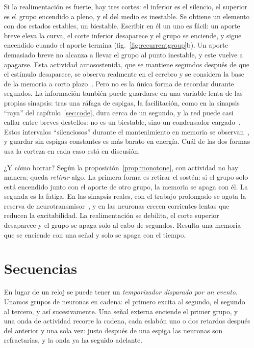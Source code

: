 Si la realimentación es fuerte, hay tres cortes: el inferior es el silencio, el superior es el grupo encendido a pleno, y el del medio es inestable. Se obtiene un elemento con dos estados estables, un biestable. Escribir en él un uno es fácil: un aporte breve eleva la curva, el corte inferior desaparece y el grupo se enciende, y sigue encendido cuando el aporte termina (fig.~\ref{fig:recurrentgroup}b). Un aporte demasiado breve no alcanza a llevar el grupo al punto inestable, y este vuelve a apagarse. Esta actividad autosostenida, que se mantiene segundos después de que el estímulo desaparece, se observa realmente en el cerebro y se considera la base de la memoria a corto plazo~\cite{Wang2001}. Pero no es la única forma de recordar durante segundos. La información también puede guardarse en una variable lenta de las propias sinapsis: tras una ráfaga de espigas, la facilitación, como en la sinapsis “raya” del capítulo~\ref{sec:code}, dura cerca de un segundo, y la red puede casi callar entre breves destellos: no es un biestable, sino un condensador cargado~\cite{Mongillo2008}. Estos intervalos “silenciosos” durante el mantenimiento en memoria se observan~\cite{Stokes2015}, y guardar sin espigas constantes es más barato en energía. Cuál de las dos formas usa la corteza en cada caso está en discusión.

¿Y cómo borrar? Según la proposición~\ref{prop:monotone}, con actividad no hay manera; queda \emph{retirar} algo. La primera forma es retirar el sostén: si el grupo solo está encendido junto con el aporte de otro grupo, la memoria se apaga con él. La segunda es la fatiga. En las sinapsis reales, con el trabajo prolongado se agota la reserva de neurotransmisor~\cite{Tsodyks1997}, y en las neuronas crecen corrientes lentas que reducen la excitabilidad. La realimentación se debilita, el corte superior desaparece y el grupo se apaga solo al cabo de segundos. Resulta una memoria que se enciende con una señal y solo se apaga con el tiempo.

\section{Secuencias}

En lugar de un reloj se puede tener un \emph{temporizador disparado por un evento}. Unamos grupos de neuronas  en cadena: el primero excita al segundo, el segundo al tercero, y así sucesivamente. Una señal externa enciende el primer grupo, y una onda de actividad recorre la cadena, cada eslabón uno o dos retardos después del anterior y una sola vez: justo después de una espiga las neuronas son refractarias, y la onda ya ha seguido adelante.

